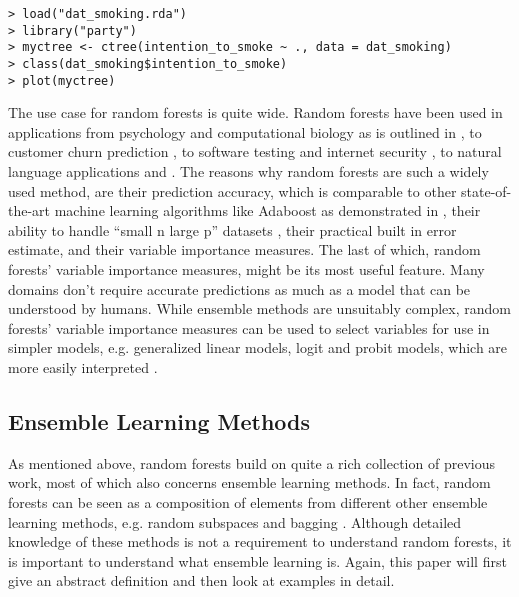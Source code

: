 \documentclass[a4paper,man,12pt,apacite,floatsintext,draftfirst]{apa6} %
\begin{document}
\begin{framed}
\begin{verbatim}
> load("dat_smoking.rda")
> library("party")
> myctree <- ctree(intention_to_smoke ~ ., data = dat_smoking)
> class(dat_smoking$intention_to_smoke)
> plot(myctree)
\end{verbatim}
\end{framed}

The use case for random forests is quite wide.
Random forests have been used in applications from psychology and
computational biology as is outlined in \cite{strobl2009introduction},
to customer churn prediction \cite{xie2009customer},
to software testing \cite{guo2004robust} and internet security
\cite{zhang2005network}, to natural language applications \cite{xu2004random}
and \cite{kobylinski2008definition}.
The reasons why random forests are such a widely used method,
are their prediction accuracy, which is comparable to other state-of-the-art
machine learning algorithms like Adaboost as demonstrated
in \cite{breiman2001random},
their ability to handle “small n large p” datasets \cite{strobl2009introduction},
their practical built in error estimate, and their variable importance measures.
The last of which, random forests' variable importance measures,
might be its most useful feature.
Many domains don't require accurate predictions as much as a model that can
be understood by humans.
While ensemble methods are unsuitably complex,
random forests' variable importance measures can be used to select variables
for use in simpler models, e.g.
generalized linear models, logit and probit models,
which are more easily interpreted \cite{strobl2009introduction}.

\subsection{Ensemble Learning Methods}
As mentioned above, random forests build on quite a rich collection of
previous work, most of which also concerns ensemble learning methods.
In fact, random forests can be seen as a composition of elements from
different other ensemble learning methods, e.g.
random subspaces \cite{ho1998random} and bagging \cite{breiman1996bagging}.
Although detailed knowledge of these methods is not a requirement to
understand random forests, it is important to understand what
ensemble learning is.
Again, this paper will first give an abstract definition and then look at
examples in detail.
\end{document}
